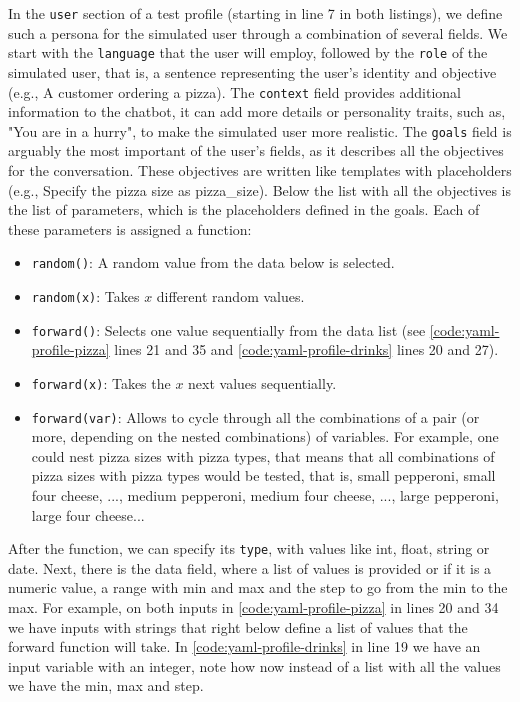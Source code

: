 In the \texttt{user} section of a test profile
(starting in line 7 in both listings),
we define such a persona for the simulated user
through a combination of several fields.
We start with the \texttt{language} that the user will employ,
followed by the \texttt{role} of the simulated user,
that is, a sentence representing the user's identity and objective
(e.g., A customer ordering a pizza).
The \texttt{context} field provides additional information to the chatbot,
it can add more details or personality traits, such as,
"You are in a hurry", to make the simulated user more realistic.
The \texttt{goals} field is arguably the most important of the user's fields,
as it describes all the objectives for the conversation.
These objectives are written like templates with placeholders
(e.g., Specify the pizza size as {{pizza\_size}}).
Below the list with all the objectives
is the list of parameters, which is the placeholders defined in the goals.
Each of these parameters is assigned a function:
\begin{itemize}
  \item \texttt{random()}: A random value from the data below is selected.
  \item \texttt{random(x)}: Takes $x$ different random values.
  \item \texttt{forward()}: Selects one value sequentially from the data list
    (see \autoref{code:yaml-profile-pizza} lines 21 and 35
    and \autoref{code:yaml-profile-drinks} lines 20 and 27).
  \item \texttt{forward(x)}: Takes the $x$ next values sequentially.
  \item \texttt{forward(var)}:
    Allows to cycle through all the combinations of a pair (or more, depending on the nested combinations) of variables.
    For example, one could nest pizza sizes with pizza types,
    that means that all combinations of pizza sizes with pizza types would be tested,
    that is, small pepperoni, small four cheese, ..., medium pepperoni, medium four cheese, ..., large pepperoni, large four cheese...
\end{itemize}
After the function, we can specify its \texttt{type},
with values like int, float, string or date.
Next, there is the data field,
where a list of values is provided
or if it is a numeric value, a range with min and max
and the step to go from the min to the max.
For example, on both inputs in \autoref{code:yaml-profile-pizza}
in lines 20 and 34 we have inputs with strings
that right below define a list of values that
the forward function will take.
In \autoref{code:yaml-profile-drinks} in line 19
we have an input variable with an integer,
note how now instead of a list with all the values
we have the min, max and step.

